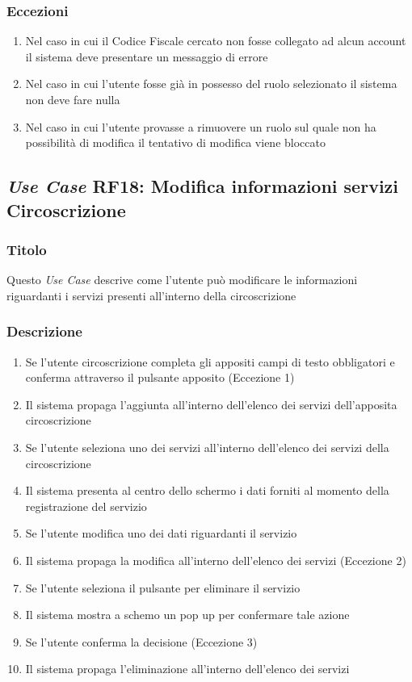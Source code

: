         \subsubsection{Eccezioni}
            \begin{enumerate}
                \item Nel caso in cui il Codice Fiscale cercato non fosse collegato ad alcun account il sistema deve presentare un messaggio di errore 
                \item Nel caso in cui l'utente fosse già in possesso del ruolo selezionato il sistema non deve fare nulla
                \item Nel caso in cui l'utente provasse a rimuovere un ruolo sul quale non ha possibilità di modifica il tentativo di modifica viene bloccato
            \end{enumerate}

    \subsection{\textit{Use Case} RF18: Modifica informazioni servizi Circoscrizione}
        \subsubsection{Titolo}
        Questo \textit{Use Case} descrive come l'utente può modificare le informazioni riguardanti i servizi presenti all'interno della circoscrizione
        \subsubsection{Descrizione}
            \begin{enumerate}
                \item Se l'utente circoscrizione completa gli appositi campi di testo obbligatori e conferma attraverso il pulsante apposito (Eccezione 1)
                \item Il sistema propaga l'aggiunta all'interno dell'elenco dei servizi dell'apposita circoscrizione
                \item Se l'utente seleziona uno dei servizi all'interno dell'elenco dei servizi della circoscrizione
                \item Il sistema presenta al centro dello schermo i dati forniti al momento della registrazione del servizio
                \item Se l'utente modifica uno dei dati riguardanti il servizio
                \item Il sistema propaga la modifica all'interno dell'elenco dei servizi (Eccezione 2)
                \item Se l'utente seleziona il pulsante per eliminare il servizio
                \item Il sistema mostra a schemo un pop up per confermare tale azione
                \item Se l'utente conferma la decisione (Eccezione 3)
                \item Il sistema propaga l'eliminazione all'interno dell'elenco dei servizi
            \end{enumerate}
